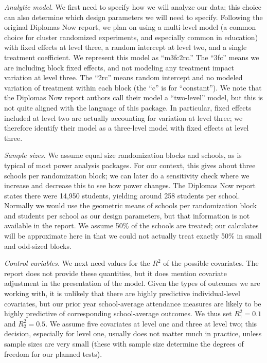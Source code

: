 \documentclass[
]{article}
\begin{document}
\emph{Analytic model.} We first need to specify how we will analyze our
data; this choice can also determine which design parameters we will
need to specify. Following the original Diplomas Now report, we plan on
using a multi-level model (a common choice for cluster randomized
experiments, and especially common in education) with fixed effects at
level three, a random intercept at level two, and a single treatment
coefficient. We represent this model as ``m3fc2rc.'' The ``3fc'' means
we are including block fixed effects, and not modeling any treatment
impact variation at level three. The ``2rc'' means random intercept and
no modeled variation of treatment within each block (the ``c'' is for
``constant''). We note that the Diplomas Now report authors call their
model a ``two-level'' model, but this is not quite aligned with the
language of this package. In particular, fixed effects included at level
two are actually accounting for variation at level three; we therefore
identify their model as a three-level model with fixed effects at level
three.

\emph{Sample sizes.} We assume equal size randomization blocks and
schools, as is typical of most power analysis packages. For our context,
this gives about three schools per randomization block; we can later do
a sensitivity check where we increase and decrease this to see how power
changes. The Diplomas Now report states there were 14,950 students,
yielding around 258 students per school. Normally we would use the
geometric means of schools per randomization block and students per
school as our design parameters, but that information is not available
in the report. We assume 50\% of the schools are treated; our calculates
will be approximate here in that we could not actually treat exactly
50\% in small and odd-sized blocks.

\emph{Control variables.} We next need values for the \(R^2\) of the
possible covariates. The report does not provide these quantities, but
it does mention covariate adjustment in the presentation of the model.
Given the types of outcomes we are working with, it is unlikely that
there are highly predictive individual-level covariates, but our prior
year school-average attendance measures are likely to be highly
predictive of corresponding school-average outcomes. We thus set
\(R^2_1 = 0.1\) and \(R^2_2 = 0.5\). We assume five covariates at level
one and three at level two; this decision, especially for level one,
usually does not matter much in practice, unless sample sizes are very
small (these with sample size determine the degrees of freedom for our
planned tests).
\end{document}
